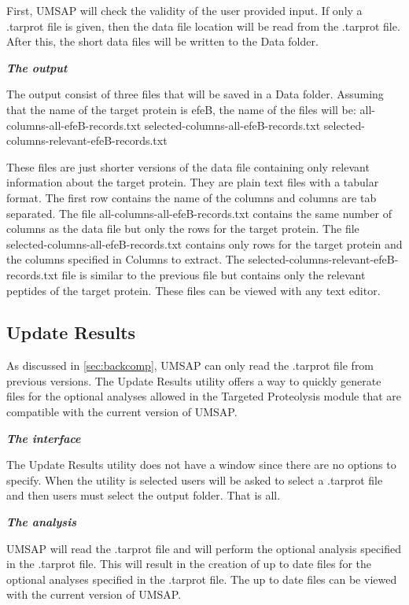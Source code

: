 First, UMSAP will check the validity of the user provided input. If only a .tarprot file is given, then the data file location will be read from the .tarprot file. After this, the short data files will be written to the Data folder.

\textit{\textbf{The output}}

The output consist of three files that will be saved in a Data folder. Assuming that the name of the target protein is efeB, the name of the files will be:\newline 
all-columns-all-efeB-records.txt \newline
selected-columns-all-efeB-records.txt \newline
selected-columns-relevant-efeB-records.txt

These files are just shorter versions of the data file containing only relevant information about the target protein. They are plain text files with a tabular format. The first row contains the name of the columns and columns are tab separated. The file all-columns-all-efeB-records.txt contains the same number of columns as the data file but only the rows for the target protein. The file selected-columns-all-efeB-records.txt contains only rows for the target protein and the columns specified in Columns to extract. The selected-columns-relevant-efeB-records.txt file is similar to the previous file but contains only the relevant peptides of the target protein. These files can be viewed with any text editor.

\subsection{Update Results}
\label{subsec:updateres}

As discussed in \autoref{sec:backcomp}, UMSAP can only read the .tarprot file from previous versions. The Update Results utility offers a way to quickly generate files for the optional analyses allowed in the Targeted Proteolysis module that are compatible with the current version of UMSAP.

\textit{\textbf{The interface}}

The Update Results utility does not have a window since there are no options to specify. When the utility is selected users will be asked to select a .tarprot file and then users must select the output folder. That is all.

\textit{\textbf{The analysis}}

UMSAP will read the .tarprot file and will perform the optional analysis specified in the .tarprot file. This will result in the creation of up to date files for the optional analyses specified in the .tarprot file. The up to date files can be viewed with the current version of UMSAP.


